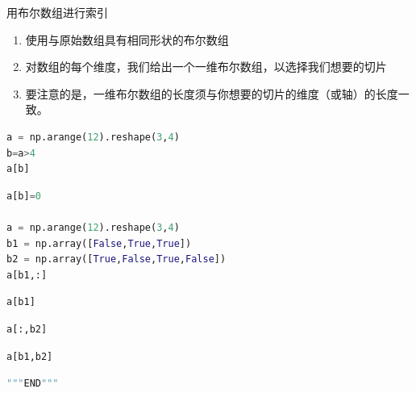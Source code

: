 \documentclass[ignorenonframetext,11pt,xcolor=dvipsnames,hyperref={colorlinks,allcolors=.,urlcolor=blue, citecolor=violet, bookmarksdepth=4},aspectratio=1610]{beamer}
\providecommand{\tightlist}{%
  \setlength{\itemsep}{0pt}\setlength{\parskip}{0pt}}
\begin{document}
\begin{frame}[fragile]{用布尔数组进行索引}
\protect\hypertarget{section-22}{}

\begin{enumerate}
\tightlist
\item
  使用与原始数组具有相同形状的布尔数组
\item
  对数组的每个维度，我们给出一个一维布尔数组，以选择我们想要的切片
\item
  要注意的是，一维布尔数组的长度须与你想要的切片的维度（或轴）的长度一致。
\end{enumerate}

\begin{lstlisting}[language=Python]
a = np.arange(12).reshape(3,4)
b=a>4
a[b]
\end{lstlisting}

\begin{lstlisting}[language=Python]
a[b]=0

a = np.arange(12).reshape(3,4)
b1 = np.array([False,True,True])
b2 = np.array([True,False,True,False])
a[b1,:]
\end{lstlisting}

\begin{lstlisting}[language=Python]
a[b1]
\end{lstlisting}

\begin{lstlisting}[language=Python]
a[:,b2]
\end{lstlisting}

\begin{lstlisting}[language=Python]
a[b1,b2]
\end{lstlisting}

\begin{lstlisting}[language=Python]
"""END"""
\end{lstlisting}

\end{frame}
\end{document}
